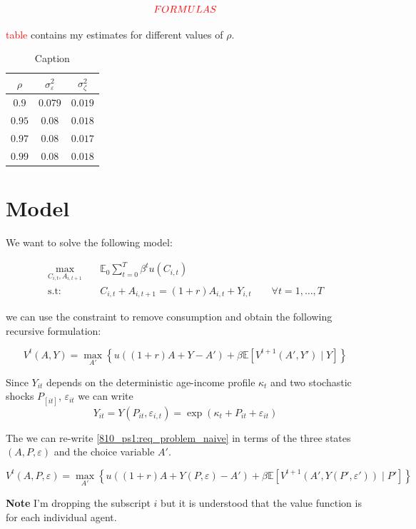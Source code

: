 \documentclass[12pt]{article}
\begin{document}
$$\textcolor{red}{FORMULAS}$$

\textcolor{red}{table} contains my estimates for different values of $\rho$.

\begin{table}[]
    \centering
    \begin{tabular}{|c|c|c|}
        \hline
        $\rho$ & $\sigma_{\varepsilon}^2$ & $\sigma_{\zeta}^2$\\
        \hline
        $0.9$ & $0.079$ & $0.019$\\
        $0.95$ & $0.08$ & $0.018$\\
        $0.97$ & $0.08$ & $0.017$\\
        $0.99$ & $0.08$ & $0.018$\\
        \hline
    \end{tabular}
    \caption{Caption}
    \label{tab:my_label}
\end{table}


\section{Model}
We want to solve the following model:

\begin{align*}\label{810_ps1:seq_problem}
\max_{C_{i,t}, A_{i,t+1}} \quad &\mathbb{E}_0 \sum_{t = 0}^{T}\beta^{t}u(C_{i,t})\\
\text{s.t:} \quad & C_{i,t} + A_{i,t+1} = (1+r)A_{i,t}+Y_{i,t} \qquad \forall t=1,\ldots,T
\end{align*}

we can use the constraint to remove consumption and obtain the following recursive formulation:

\begin{equation}\label{810_ps1:req_problem_naive}
    V^t(A, Y) = \max_{A'}\left\{u\left( (1+r)A+Y - A'\right) + \beta \mathbb{E}\left[ V^{t+1}(A', Y') \mid Y \right] \right\}
\end{equation}

Since $Y_{it}$ depends on the deterministic age-income profile $\kappa_t$ and two stochastic shocks $P_[it]$, $\varepsilon_{it}$ we can write $$Y_{it} = Y(P_{it}, \varepsilon_{i,t}) = \exp{(\kappa_t + P_{it} + \varepsilon_{it})}$$

The we can re-write \eqref{810_ps1:req_problem_naive} in terms of the three states $(A, P, \varepsilon)$ and the choice variable $A'$.

\begin{equation}\label{810_ps1:req_problem}
     V^t(A, P, \varepsilon) = \max_{A'}\left\{u\left( (1+r)A+ Y(P, \varepsilon) - A'\right) + \beta \mathbb{E}\left[ V^{t+1}(A', Y(P', \varepsilon')) \mid P' \right] \right\}
\end{equation}

\textbf{Note} I'm dropping the subscript $i$ but it is understood that the value function is for each individual agent.





\end{document}

